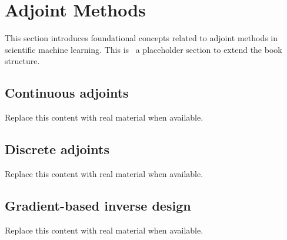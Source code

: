 \section{Adjoint Methods}
This section introduces foundational concepts related to adjoint methods in scientific machine learning. This is~\cite{abdulmaksoudTransformerBasedSensorFusion2025} a placeholder section to extend the book structure.

\subsection{Continuous adjoints}
Replace this content with real material when available.

\subsection{Discrete adjoints}
Replace this content with real material when available.

\subsection{Gradient-based inverse design}
Replace this content with real material when available.
